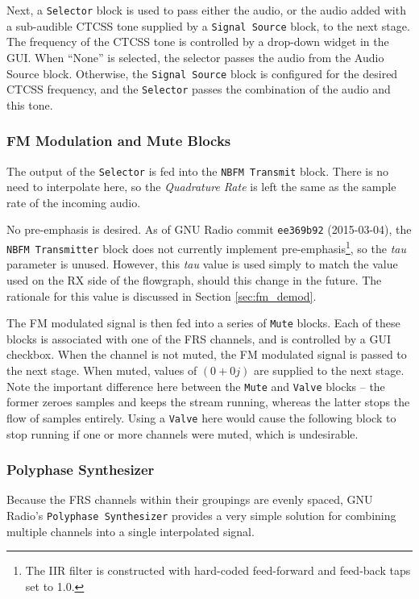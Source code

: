 Next, a \texttt{Selector} block is used to pass either the audio, or the audio
added with a sub-audible \ac{CTCSS} tone supplied by a \texttt{Signal Source} block, to the
next stage. The frequency of the \ac{CTCSS} tone is controlled by a drop-down
widget in the GUI.  When ``None'' is selected, the selector passes the audio
from the Audio Source block.  Otherwise, the \texttt{Signal Source} block is
configured for the desired \ac{CTCSS} frequency, and the \texttt{Selector}
passes the combination of the audio and this tone.

\subsubsection{FM Modulation and Mute Blocks}

The output of the \texttt{Selector} is fed into the \texttt{NBFM Transmit} block.
There is no need to interpolate here, so the \textit{Quadrature Rate} is left
the same as the sample rate of the incoming audio.

No pre-emphasis is desired. As of GNU Radio commit \texttt{ee369b92}
(2015-03-04), the \texttt{NBFM Transmitter} block does not currently implement
pre-emphasis\footnote{The IIR filter is constructed with hard-coded
feed-forward and feed-back taps set to 1.0.}, so the \textit{tau} parameter
is unused.  However, this \textit{tau} value is used simply to match the value
used on the RX side of the flowgraph, should this change in the future. The
rationale for this value is discussed in Section \ref{sec:fm_demod}.

The FM modulated signal is then fed into a series of \texttt{Mute} blocks. Each
of these blocks is associated with one of the \ac{FRS} channels, and is
controlled by a \ac{GUI} checkbox. When the channel is not muted, the FM modulated
signal is passed to the next stage. When muted, values of $(0 + 0j)$ are
supplied to the next stage. Note the important difference here between the
\texttt{Mute} and \texttt{Valve} blocks -- the former zeroes samples and keeps
the stream running, whereas the latter stops the flow of samples entirely.
Using a \texttt{Valve} here would cause the following block to stop running if
one or more channels were muted, which is undesirable.

\subsubsection{Polyphase Synthesizer} \label{sec:polysynth}
Because the \ac{FRS} channels within their groupings are evenly spaced,
GNU Radio's \texttt{Polyphase Synthesizer} \cite{TRONDEAU_PFB} provides a very
simple solution for combining multiple channels into a single interpolated signal.

